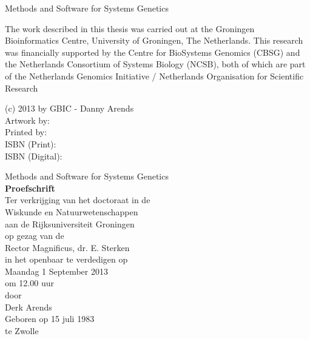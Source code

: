 \documentclass[8pt, twoside]{book}
\newcommand{\bold}[1]{{\bfseries #1}}
\newcommand{\mytitle}[1]{{\LARGE #1}}
\begin{document}
  \thispagestyle{empty}
  \begin{center}
  \mytitle{Methods and Software for Systems Genetics}\\
  \end{center}
\newpage
  \thispagestyle{empty}
  \noindent The work described in this thesis was carried out at the Groningen 
  Bioinformatics Centre, University of Groningen, The Netherlands. This research 
  was financially supported by the Centre for BioSystems Genomics (CBSG) and the 
  Netherlands Consortium of Systems Biology (NCSB), both of which are part of the 
  Netherlands Genomics Initiative / Netherlands Organisation for Scientific Research\\
  \vspace{130 mm}
  
  \noindent (c) 2013 by GBIC - Danny Arends\\
  Artwork by:\\
  Printed by:\\
  ISBN (Print):\\
  ISBN (Digital):\\
\newpage

\thispagestyle{empty}
\begin{center}
  \mytitle{Methods and Software for Systems Genetics}\\
    \vspace{10 mm}
  \bold{Proefschrift}\\
    \vspace{10 mm}
  Ter verkrijging van het doctoraat in de \\
  Wiskunde en Natuurwetenschappen \\
  aan de Rijksuniversiteit Groningen \\
  op gezag van de \\
  Rector Magnificus, dr. E. Sterken\\ 
  in het openbaar te verdedigen op \\
  Maandag 1 September 2013 \\
  om 12.00 uur \\
    \vspace{10 mm}
  door\\
    \vspace{10 mm}
  Derk Arends\\
    \vspace{10 mm}
  Geboren op 15 juli 1983\\
  te Zwolle
\end{center}
\end{document}
